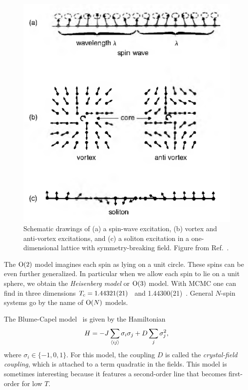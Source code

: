 \begin{figure} 
\centering
\includegraphics[width=0.6\linewidth]{figs/vortex.pdf}
\caption{
Schematic drawings of (a) a spin-wave excitation,
(b) vortex and anti-vortex excitations, and (c)
a soliton excitation in a one-dimensional lattice
with symmetry-breaking field.
Figure from Ref.~\cite{landau_guide_2021}.
}
\label{fig:classicalExcitations}
\end{figure}

The $\operatorname{\text{O}}(2)$ model imagines each spin as lying on a unit circle. These spins can be
even further generalized. In particular when we allow each spin to lie on a unit
sphere, we obtain the {\it Heisenberg model}
or $\operatorname{\text{O}}(3)$ model. With MCMC one can find in three dimensions
$T_{\rm c}=1.44321(21)$~\cite{peczak_high-accuracy_1991}
and 1.44300(21)~\cite{holm_critical_1993}.
General $N$-spin systems go by the name of $\operatorname{\text{O}}(N)$ models.

The Blume-Capel 
model~\cite{blume_theory_1966,capel_possibility_1966} is given
by the Hamiltonian
\begin{equation}\label{eq:blume-capel}
H=-J\sum_{\ev{i j}} \sigma_i \sigma_j+D \sum_j\sigma_j^2,
\end{equation}
where $\sigma_i\in\{-1,0,1\}$. For this model, the coupling $D$ is called
the {\it crystal-field coupling}, which is attached to a term quadratic in the
fields. This model is sometimes interesting because it features a second-order
line that becomes first-order for low $T$.

